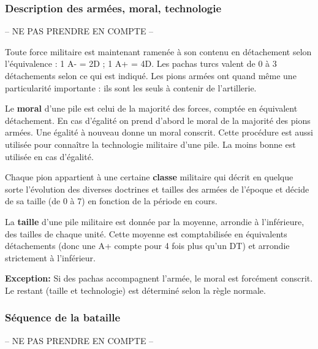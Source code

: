 \subsubsection{Description des armées, moral, technologie}
-- NE PAS PRENDRE EN COMPTE --

Toute force militaire est maintenant ramenée à son contenu en détachement selon 
l'équivalence : 1 A- = 2D ; 1 A+ = 4D.
Les pachas turcs valent de 0 à 3 détachements selon ce qui est indiqué.
Les pions armées ont quand même une particularité importante : ils sont
les seuls à contenir de l'artillerie.

Le \textbf{moral} d'une pile est celui de la majorité des forces, comptée en équivalent détachement. 
En cas d'égalité on prend d'abord le moral de la majorité des pions armées. Une égalité
à nouveau donne un moral conscrit.
Cette procédure est aussi utilisée pour connaître la technologie
militaire d'une pile. La moins bonne est utilisée en cas d'égalité.

Chaque pion appartient à une certaine \textbf{classe} militaire 
qui décrit en quelque sorte l'évolution des diverses doctrines et tailles
des armées de l'époque et
décide de sa taille (de 0 à 7) en fonction de la période en cours.

La \textbf{taille} d'une pile militaire est donnée par la moyenne,
arrondie à l'inférieure, des tailles de chaque unité. Cette moyenne
est comptabilisée en équivalents détachements (donc une A+
compte pour 4 fois plus qu'un DT) et arrondie strictement à l'inférieur.

\textbf{Exception:} Si des pachas accompagnent l'armée, le moral est forcément
conscrit. Le restant (taille et technologie) est déterminé selon la règle normale.

\subsubsection{Séquence de la bataille}
-- NE PAS PRENDRE EN COMPTE --

